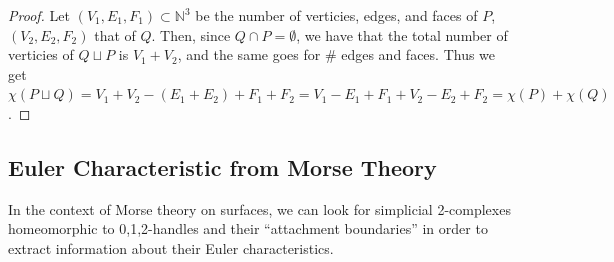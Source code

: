 \documentclass[12pt]{article}
\newcommand{\bN}{{\mathbb N}}
\theoremstyle{definition}
\begin{document}
\begin{proof}
	Let $(V_1,E_1,F_1) \subset \bN^3$ be the number of verticies, edges, and faces of $P$, $(V_2,E_2,F_2)$ that of $Q$. Then, since $Q \cap P = \emptyset$, we have that the total number of verticies of $Q\sqcup P$ is $V_1+V_2$, and the same goes for $\#$ edges and faces. Thus we get $\chi(P\sqcup Q) = V_1 +V_2 -(E_1+E_2)+F_1+F_2 = V_1-E_1+F_1 + V_2-E_2+F_2 = \chi(P) +\chi(Q)$. 
\end{proof}

\subsection{Euler Characteristic from Morse Theory}


\noindent
In the context of Morse theory on surfaces, we can look for simplicial 2-complexes homeomorphic to 0,1,2-handles and their ``attachment boundaries'' in order to extract information about their Euler characteristics. 
\end{document}

